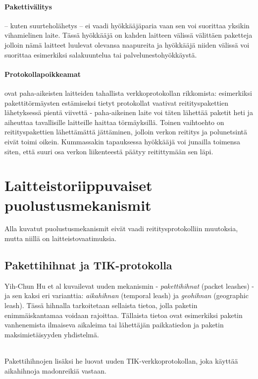 \documentclass[finnish]{tktltiki2}
\theoremstyle{definition}
\theoremstyle{remark}
\begin{document}
\paragraph{Pakettivälitys} -- kuten suurteholähetys -- ei vaadi hyökkääjäparia vaan sen voi suorittaa yksikin vihamielinen laite. Tässä hyökkääjä on kahden laitteen välissä välittäen paketteja jolloin nämä laitteet luulevat olevansa naapureita ja hyökkääjä niiden välissä voi suorittaa esimerkiksi salakuuntelua tai palvelunestohyökkäystä.

\paragraph{Protokollapoikkeamat} ovat paha-aikeisten laitteiden tahallista verkkoprotokollan rikkomista: esimerkiksi pakettitörmäysten estämiseksi tietyt protokollat vaativat reitityspakettien lähetyksessä pientä viivettä - paha-aikeinen laite voi täten lähettää paketit heti ja aiheuttaa tavallisille laitteille haittaa törmäyksillä. Toinen vaihtoehto on reitityspakettien lähettämättä jättäminen, jolloin verkon reititys ja polunetsintä eivät toimi oikein. Kummassakin tapauksessa hyökkääjä voi junailla toimensa siten, että suuri osa verkon liikenteestä päätyy reitittymään sen läpi.

\section{Laitteistoriippuvaiset puolustusmekanismit}

Alla kuvatut puolustusmekanismit eivät vaadi reititysprotokolliin muutoksia, mutta niillä on laitteistovaatimuksia.

\subsection{Pakettihihnat ja TIK-protokolla}
\label{packetleashes}
Yih-Chun Hu et al \cite{leashes} kuvailevat uuden mekanismin - \emph{pakettihihnat} (packet leashes) - ja sen kaksi eri varianttia: \emph{aikahihnan} (temporal leash) ja \emph{geohihnan} (geographic leash). Tässä hihnalla tarkoitetaan sellaista tietoa, jolla paketin enimmäiskantamaa voidaan rajoittaa. Tällaista tietoa ovat esimerkiksi paketin vanhenemista ilmaiseva aikaleima tai lähettäjän paikkatiedon ja paketin maksimietäisyyden yhdistelmä.

\noindent \\
Pakettihihnojen lisäksi he luovat uuden TIK-verkkoprotokollan, joka käyttää aikahihnoja madonreikiä vastaan.
\end{document}
